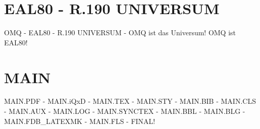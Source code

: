\documentclass{MAIN}
\begin{document}
\maketitle
\section*{EAL80 - R.190 UNIVERSUM}
OMQ - EAL80 - R.190 UNIVERSUM - OMQ ist das Universum! OMQ ist EAL80!
\section*{MAIN}
MAIN.PDF - MAIN.iQxD - MAIN.TEX - MAIN.STY - MAIN.BIB - MAIN.CLS - MAIN.AUX - MAIN.LOG - MAIN.SYNCTEX - MAIN.BBL - MAIN.BLG - MAIN.FDB_LATEXMK - MAIN.FLS - FINAL!
\cite{omq_eal80}

\end{document}
